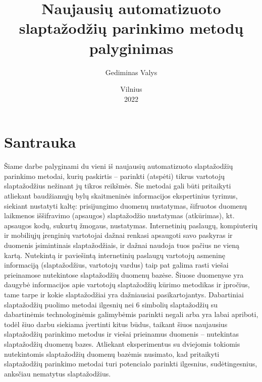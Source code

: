 \documentclass{VUMIFInfBakalaurinis}
\institute{Duomenų mokslo ir skaitmeninių technologijų institutas}
\title{Naujausių automatizuoto slaptažodžių parinkimo metodų palyginimas}
\author{Gediminas Valys}
\date{Vilnius \\ 2022}
\begin{document}
\maketitle

\tableofcontents


\section{Santrauka}
Šiame darbe palyginami du vieni iš naujausių automatizuoto slaptažodžių 
parinkimo metodai, kurių paskirtis -- parinkti (atspėti) tikrus vartotojų 
slaptažodžius nežinant jų tikros reikšmės. Šie metodai gali būti pritaikyti 
atliekant baudžiamųjų bylų skaitmeninės informacijos ekspertinius tyrimus, 
siekiant nustatyti kaltę: prisijungimo duomenų nustatymas, šifruotos duomenų 
laikmenos iššifravimo (apsaugos) slaptažodžio nustatymas (atkūrimas), kt. 
apsaugos kodų, sukurtų žmogaus, nustatymas. Internetinių paslaugų, kompiuterių 
ir mobiliųjų įrenginių vartotojai dažnai renkasi apsaugoti savo paskyras ir 
duomenis įsimintinais slaptažodžiais, ir dažnai naudoja tuos pačius ne vieną 
kartą.
Nutekintą ir paviešintą internetinių paslaugų vartotojų asmeninę informaciją 
(slaptažodžius, vartotojų vardus) taip pat galima rasti viešai prieinamose 
nutekintose slaptažodžių duomenų bazėse.
Šiuose duomenyse yra daugybė informacijos apie vartotojų slaptažodžių kūrimo 
metodikas ir įpročius, tame tarpe ir kokie slaptažodžiai yra dažniausiai 
pasikartojantys. Dabartiniai slaptažodžių puolimo metodai ilgesnių nei 6 
simbolių slaptažodžių su dabartinėmis technologinėmis galimybėmis parinkti 
negali arba yra labai apriboti, todėl šiuo darbu siekiama įvertinti kitus būdus, 
taikant šiuos naujausius slaptažodžių parinkimo metodus ir viešai prieinamus 
duomenis -- nutekintas slaptažodžių duomenų bazes. Atliekant eksperimentus su 
dviejomis tokiomis nutekintomis slaptažodžių duomenų bazėmis nusimato, kad 
pritaikyti slaptažodžių parinkimo metodai turi potencialo parinkti ilgesnius, 
sudėtingesnius, anksčiau nematytus slaptažodžius.
\end{document}
